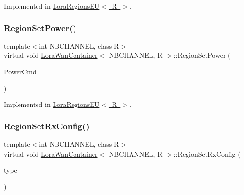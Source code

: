 Implemented in \mbox{\hyperlink{class_lora_regions_e_u_a9aef35dea0d5101768696bed87fa8380}{Lora\+Regions\+E\+U$<$ R $>$}}.

\mbox{\label{class_lora_wan_container_a6f489634d893e32270ded4b471f93080}} 
\subsubsection{\texorpdfstring{Region\+Set\+Power()}{RegionSetPower()}}
{\footnotesize\ttfamily template$<$int N\+B\+C\+H\+A\+N\+N\+EL, class R$>$ \\
virtual void \mbox{\hyperlink{class_lora_wan_container}{Lora\+Wan\+Container}}$<$ N\+B\+C\+H\+A\+N\+N\+EL, R $>$\+::Region\+Set\+Power (\begin{DoxyParamCaption}\item[{uint8\+\_\+t}]{Power\+Cmd }\end{DoxyParamCaption})\hspace{0.3cm}{\ttfamily [pure virtual]}}



Implemented in \mbox{\hyperlink{class_lora_regions_e_u_a322d0f9d2a00243ef01fe15c017ed288}{Lora\+Regions\+E\+U$<$ R $>$}}.

\mbox{\label{class_lora_wan_container_a6d9c6a90a373153f95897951b877d826}} 
\subsubsection{\texorpdfstring{Region\+Set\+Rx\+Config()}{RegionSetRxConfig()}}
{\footnotesize\ttfamily template$<$int N\+B\+C\+H\+A\+N\+N\+EL, class R$>$ \\
virtual void \mbox{\hyperlink{class_lora_wan_container}{Lora\+Wan\+Container}}$<$ N\+B\+C\+H\+A\+N\+N\+EL, R $>$\+::Region\+Set\+Rx\+Config (\begin{DoxyParamCaption}\item[{\mbox{\hyperlink{_define_8h_ab894a4c21b8aae9e9c68d8c426a66956}{e\+Rx\+Win\+Type}}}]{type }\end{DoxyParamCaption})\hspace{0.3cm}{\ttfamily [pure virtual]}}



